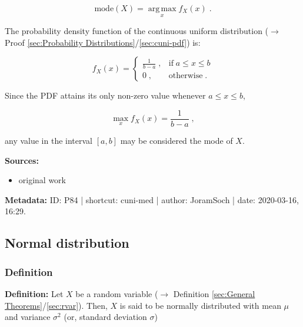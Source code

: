 \documentclass[a4paper,12pt,twoside]{book}
\begin{document}
\begin{equation} \label{eq:cuni-med-mode}
\mathrm{mode}(X) = \operatorname*{arg\,max}_x f_X(x) \; .
\end{equation}

The probability density function of the continuous uniform distribution ($\rightarrow$ Proof \ref{sec:Probability Distributions}/\ref{sec:cuni-pdf}) is:

\begin{equation} \label{eq:cuni-med-cuni-pdf}
f_X(x) = \left\{
\begin{array}{rl}
\frac{1}{b-a} \; , & \text{if} \; a \leq x \leq b \\
0 \; , & \text{otherwise} \; .
\end{array}
\right.
\end{equation}

Since the PDF attains its only non-zero value whenever $a \leq x \leq b$,

\begin{equation} \label{eq:cuni-med-cuni-pdf-max}
\operatorname*{max}_x f_X(x) = \frac{1}{b-a} \; ,
\end{equation}

any value in the interval $[a,b]$ may be considered the mode of $X$.


\vspace{1em}
\textbf{Sources:}
\begin{itemize}
\item original work\end{itemize}


\vspace{1em}
\textbf{Metadata:} ID: P84 | shortcut: cuni-med | author: JoramSoch | date: 2020-03-16, 16:29.
\vspace{1em}



\subsection{Normal distribution}

\subsubsection[\textit{Definition}]{Definition} \label{sec:norm}
\setcounter{equation}{0}

\textbf{Definition:} Let $X$ be a random variable ($\rightarrow$ Definition \ref{sec:General Theorems}/\ref{sec:rvar}). Then, $X$ is said to be normally distributed with mean $\mu$ and variance $\sigma^2$ (or, standard deviation $\sigma$)
\end{document}
